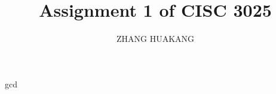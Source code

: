 \documentclass{article}
\title{Assignment 1 of CISC 3025}
\author{ZHANG HUAKANG}
\begin{document}
    \maketitle
    \section{}
    \begin{algorithm} 
        \caption{} 
        \label{alg3} 
        \begin{algorithmic}
            \State gcd
            \EndFunction
        \end{algorithmic} 
    \end{algorithm}
\end{document}
